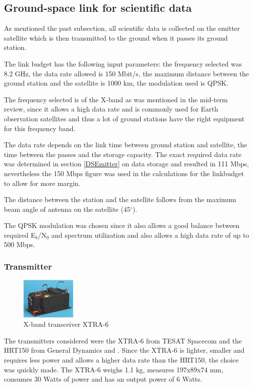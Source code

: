 \subsection{Ground-space link for scientific data}
As mentioned the past subsection, all scientific data is collected on the emitter satellite which is then transmitted to the ground when it passes its ground station.

The link budget has the following input parameters: the frequency selected was 8.2 GHz, the data rate allowed is 150 Mbit/s, the maximum distance between the ground station and the satellite is 1000 km, the modulation used is QPSK.

The frequency selected is of the X-band as was mentioned in the mid-term review, since it allows a high data rate and is commonly used for Earth observation satellites and thus a lot of ground stations have the right equipment for this frequency band.

The data rate depends on the link time between ground station and satellite, the time between the passes and the storage capacity. The exact required data rate was determined in section \ref{DSEmitter} on data storage and resulted in 111 Mbps, nevertheless the 150 Mbps figure was used in the calculations for the linkbudget to allow for more margin.

The distance between the station and the satellite follows from the maximum beam angle of antenna on the satellite (45$^{\circ}$).

The QPSK modulation was chosen since it also allows a good balance between required E$_{b}$/N$_{0}$ and spectrum utilization and also allows a high data rate of up to 500 Mbps.

\subsubsection{Transmitter}
\begin{figure}
\vspace{-50pt}
  \begin{center}
    \includegraphics[width=0.24\textwidth]{chapters/img/Xtrans.png}
  \end{center}
  \vspace{-15pt}
  \caption{X-band transceiver XTRA-6}
  \vspace{-40pt}
  \label{Xtrans}
\end{figure}
The transmitters considered were the XTRA-6 from TESAT Spacecom \cite{TESATxtra} and the HRT150 from General Dynamics and \cite{GD150}. Since the XTRA-6 is lighter, smaller and requires less power and allows a higher data rate than the HRT150, the choice was quickly made.
The XTRA-6 weighs 1.1 kg, measures 197x89x74 mm, consumes 30 Watts of power and has an output power of 6 Watts.

